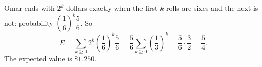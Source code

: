 Omar ends with $2^k$ dollars exactly when the first $k$ rolls are sixes and the next is not: probability $\left(\dfrac16\right)^k\dfrac56$. So
\[E=\sum_{k\ge0}2^k\left(\dfrac16\right)^k\dfrac56=\dfrac56\sum_{k\ge0}\left(\dfrac13\right)^k=\dfrac56\cdot\dfrac32=\dfrac54.\]
The expected value is $\boxed{\$1.250}$.
